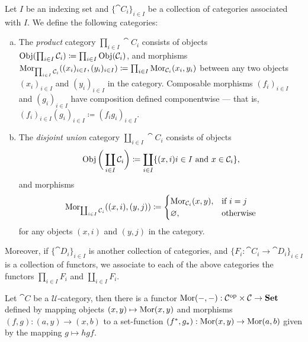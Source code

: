 \begin{definition}
\label{def:product-disjoint-categories}
Let \(I\) be an indexing set and \(\{\cat C_{i}\}_{i \in I}\) be a collection of
categories associated with \(I\). We define the following categories:
\begin{enumerate}[(a)]\setlength\itemsep{0em}
\item The \emph{product} category \(\prod_{i \in I} \cat C_i\) consists of objects
  \(\operatorname{Obj}(\prod_{i \in I} \mathcal C_i) \coloneq \prod_{i \in I} \operatorname{Obj}(\mathcal C_i)\),
  and morphisms \(\operatorname{Mor}_{\prod_{i \in I} \mathcal C_i}((x_i)_{i \in I}, (y_i)_{i \in
    I}) \coloneq \prod_{i \in I} \operatorname{Mor}_{\mathcal C_i}(x_i, y_i)\) between any two
  objects \((x_i)_{i \in I}\) and \((y_i)_{i \in I}\) in the category. Composable
  morphisms \((f_i)_{i \in I}\) and \((g_i)_{i \in I}\) have composition defined
  componentwise --- that is, \((f_i)_{i \in I} (g_i)_{i \in I} \coloneq
  (f_i g_i)_{i \in I}\).
\item The \emph{disjoint union} category \(\coprod_{i \in I} \cat C_i\) consists
  of objects
  \[
    \operatorname{Obj}\bigg(\coprod_{i \in I} \mathcal C_i\bigg) \coloneq
    \coprod_{i \in I} \{(x, i) \relax i \in I \text{ and } x \in \mathcal C_i\},
  \]
  and morphisms
  \[
    \operatorname{Mor}_{\coprod_{i \in I} \mathcal C_i}((x, i), (y, j)) \coloneq
    \begin{cases}
      \operatorname{Mor}_{\mathcal C_i}(x, y), &\text{if } i = j \\
      \varnothing, &\text{otherwise}
    \end{cases}
  \]
  for any objects \((x, i)\) and \((y, j)\) in the category.
\end{enumerate}
Moreover, if \(\{\cat D_{i}\}_{i \in I}\) is another collection of categories,
and \(\{F_{i}: \cat C_i \to \cat D_i\}_{i \in I}\) is a collection of functors,
we associate to each of the above categories the functors \(\prod_{i \in I}
F_i\) and \(\coprod_{i \in I} F_i\).
\end{definition}

\begin{definition}
\label{def:two-sided-represented-functor}
Let \(\cat C\) be a \(\mathcal U\)-category, then there is a functor \(\operatorname{Mor}(-,
-): \mathcal C^{\mathrm{op}} \times \mathcal C \to {\textbf{Set}}\) defined by mapping objects \((x, y)
\mapsto \operatorname{Mor}(x, y)\) and morphisms \((f, g): (a, y) \to (x, b)\) to a
set-function \((f^{*}, g_{*}): \operatorname{Mor}(x, y) \to \operatorname{Mor}(a, b)\) given by the mapping
\(g \mapsto h g f\).
\end{definition}

